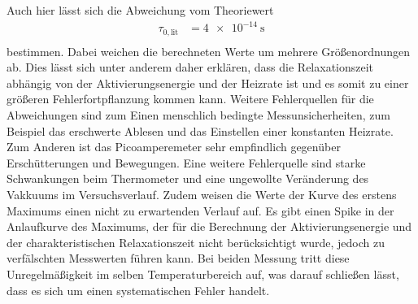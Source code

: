  
Auch hier lässt sich die Abweichung vom Theoriewert\cite{RMucillo} 
\begin{align*}
    \tau_{0,\text{lit}}&= \qty{4e-14}{\second}\\
\end{align*}
bestimmen. Dabei weichen die berechneten Werte um mehrere
Größenordnungen ab. Dies lässt sich unter anderem daher erklären, dass die Relaxationszeit abhängig von
der Aktivierungsenergie und der Heizrate ist und es somit zu einer größeren Fehlerfortpflanzung kommen kann.
Weitere Fehlerquellen für die Abweichungen sind zum Einen menschlich bedingte Messunsicherheiten, zum Beispiel
das erschwerte Ablesen und das Einstellen einer konstanten Heizrate. Zum Anderen ist das Picoamperemeter
sehr empfindlich gegenüber Erschütterungen und Bewegungen.
Eine weitere Fehlerquelle sind starke Schwankungen beim Thermometer und eine ungewollte Veränderung 
des Vakkuums im Versuchsverlauf. Zudem weisen die Werte der Kurve des erstens Maximums einen nicht zu erwartenden Verlauf auf.
Es gibt einen Spike in der Anlaufkurve des Maximums, der für die Berechnung der Aktivierungsenergie und der
charakteristischen Relaxationszeit nicht berücksichtigt wurde, jedoch zu verfälschten Messwerten führen kann.
Bei beiden Messung tritt diese Unregelmäßigkeit im selben Temperaturbereich auf, was darauf schließen lässt,
dass es sich um einen systematischen Fehler handelt.